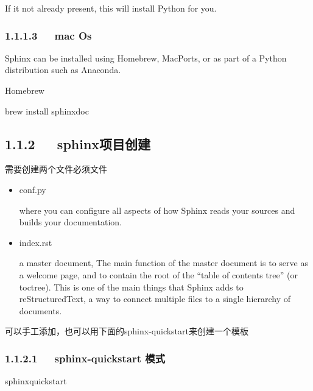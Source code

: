 \documentclass[letterpaper,12pt,english]{sphinxmanual}
\begin{document}
If it not already present, this will install Python for you.


\subsubsection{1.1.1.3   mac Os}
\label{\detokenize{001software/001install/sphinx:mac-os}}
Sphinx can be installed using Homebrew, MacPorts, or as part of a Python distribution such as Anaconda.

Homebrew

\begin{sphinxVerbatim}[commandchars=\\\{\}]
\PYGZdl{} brew install sphinx\PYGZhy{}doc
\end{sphinxVerbatim}


\subsection{1.1.2   sphinx项目创建}
\label{\detokenize{001software/001install/sphinx:id2}}

需要创建两个文件必须文件
\begin{itemize}
\item {} 
conf.py

where you can configure all aspects of how Sphinx reads your sources and builds your documentation.

\item {} 
index.rst

a master document, The main function of the master document is to serve as a welcome page, and to contain the root of the “table of contents tree” (or toctree). This is one of the main things that Sphinx adds to reStructuredText, a way to connect multiple files to a single hierarchy of documents.

\end{itemize}

可以手工添加，也可以用下面的sphinx-quickstart来创建一个模板


\subsubsection{1.1.2.1   sphinx-quickstart 模式}
\label{\detokenize{001software/001install/sphinx:sphinx-quickstart}}
\begin{sphinxVerbatim}[commandchars=\\\{\}]
\PYGZdl{} sphinx\PYGZhy{}quickstart
\end{sphinxVerbatim}
\end{document}
